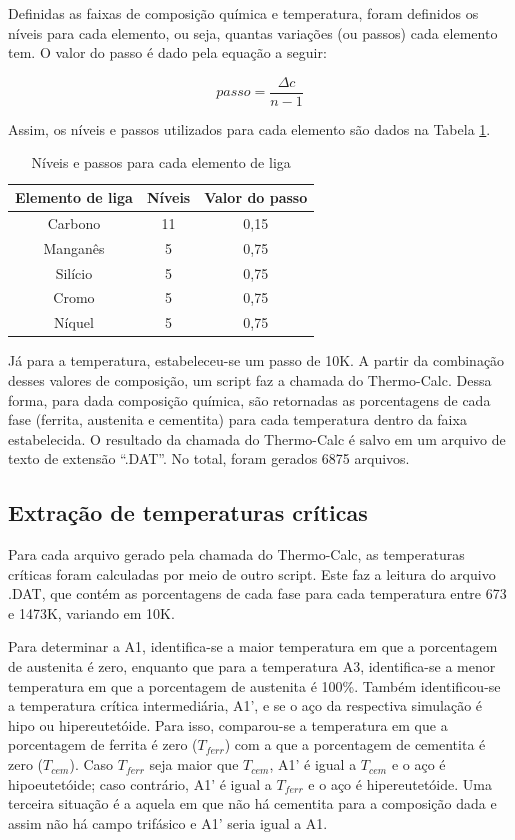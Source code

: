 \documentclass[brazil,tf,epusp]{usp}  %
\begin{document}
Definidas as faixas de composição química e temperatura, foram definidos os níveis para cada elemento, ou seja, quantas variações (ou passos) cada elemento tem. O valor do passo é dado pela equação a seguir:

\begin{equation}
  passo = \frac{\Delta c}{n - 1}
\end{equation}

Assim, os níveis e passos utilizados para cada elemento são dados na Tabela \ref{tab:niveis_e_passos}.

\begin{table}
  \caption{Níveis e passos para cada elemento de liga}

  \begin{tabular}{c c c}
  \hline
  \textbf{Elemento de liga} & \textbf{Níveis} & \textbf{Valor do passo} \\
  \hline
  Carbono & 11 & 0,15 \\
  Manganês & 5 & 0,75 \\
  Silício & 5 & 0,75 \\
  Cromo & 5 & 0,75 \\
  Níquel & 5 & 0,75 \\
  \hline
  \end{tabular}

  \label{tab:niveis_e_passos}
\end{table}

Já para a temperatura, estabeleceu-se um passo de 10K. A partir da combinação desses valores de composição, um script faz a chamada do Thermo-Calc\textregistered{}. Dessa forma, para dada composição química, são retornadas as porcentagens de cada fase (ferrita, austenita e cementita) para cada temperatura dentro da faixa estabelecida. O resultado da chamada do Thermo-Calc\textregistered{} é salvo em um arquivo de texto de extensão ``.DAT''. No total, foram gerados 6875 arquivos.

\subsection{Extra\c{c}\~ao de temperaturas cr\'iticas}

Para cada arquivo gerado pela chamada do Thermo-Calc\textregistered{}, as temperaturas críticas foram calculadas por meio de outro script. Este faz a leitura do arquivo .DAT, que contém as porcentagens de cada fase para cada temperatura entre 673 e 1473K, variando em 10K.

Para determinar a A1, identifica-se a maior temperatura em que a porcentagem de austenita é zero, enquanto que para a temperatura A3, identifica-se a menor temperatura em que a porcentagem de austenita é 100\%. Também identificou-se a temperatura crítica intermediária, A1', e se o aço da respectiva simulação é hipo ou hipereutetóide. Para isso, comparou-se a temperatura em que a porcentagem de ferrita é zero ($T_{ferr}$) com a que a porcentagem de cementita é zero ($T_{cem}$). Caso $T_{ferr}$ seja maior que $T_{cem}$, A1' é igual a $T_{cem}$ e o aço é hipoeutetóide; caso contrário, A1' é igual a $T_{ferr}$ e o aço é hipereutetóide. Uma terceira situação é a aquela em que não há cementita para a composição dada e assim não há campo trifásico e A1' seria igual a A1.
\end{document}
